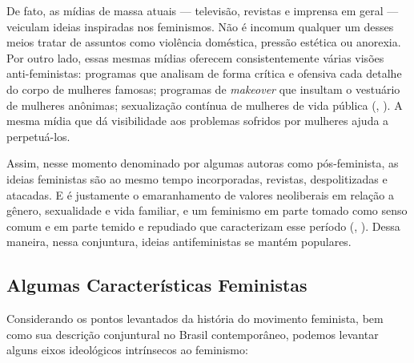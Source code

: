 \documentclass[
	12pt,				%
	openright,			%
	twoside,			%
	a4paper,			%
	english,			%
	brazil				%
	]{abntex2}
\begin{document}
 De fato, as mídias de massa atuais --- televisão, revistas e imprensa em geral --- veiculam ideias inspiradas nos feminismos. Não é incomum qualquer um desses meios tratar de assuntos como violência doméstica, pressão estética ou anorexia. Por outro lado, essas mesmas mídias oferecem consistentemente várias visões anti-feministas: programas que analisam de forma crítica e ofensiva cada detalhe do corpo de mulheres famosas; programas de \emph{makeover} que insultam o vestuário de mulheres anônimas; sexualização contínua de mulheres de vida pública (, \citeyear{gill2007}). A mesma mídia que dá visibilidade aos problemas sofridos por mulheres ajuda a perpetuá-los.

 Assim, nesse momento denominado por algumas autoras como pós-feminista, as ideias feministas são ao mesmo tempo incorporadas, revistas, despolitizadas e atacadas. E é justamente o emaranhamento de valores neoliberais em relação a gênero, sexualidade e vida familiar, e um feminismo em parte tomado como senso comum e em parte temido e repudiado que caracterizam esse período (, \citeyear{gill2007}). Dessa maneira, nessa conjuntura, ideias antifeministas se mantém populares.
 
 \subsection{Algumas Características Feministas}\label{caractfem}
  Considerando os pontos levantados da história do movimento feminista, bem como sua descrição conjuntural no Brasil contemporâneo, podemos levantar alguns eixos ideológicos intrínsecos ao feminismo:
  
\end{document}
